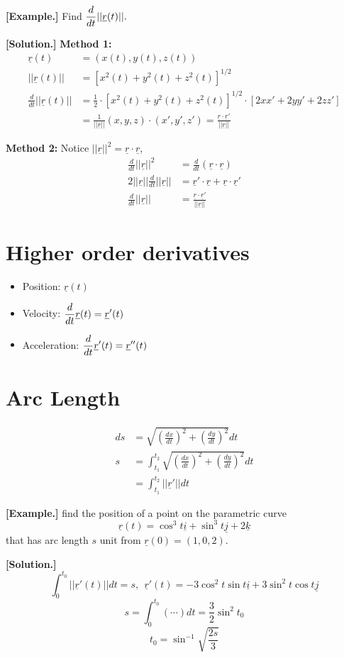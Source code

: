 \documentclass[11pt, a4paper]{MATH2023}
\newcommand{\eg}{\textbf{[Example.] }}
\newcommand{\sol}{\textbf{[Solution.] }}
\newcommand{\rr}{\underline{r}}
\newcommand{\ii}{\underline{i}}
\newcommand{\kk}{\underline{k}}
\newcommand{\jj}{\underline{j}}
\begin{document}
\begin{spacing}{1.3}
    \eg Find $\disp \frac{d}{dt}||\rr(t)||.$

    \sol {\bf Method 1:}
    \begin{align*}
        \rr(t) &= (x(t), y(t), z(t))\\
        ||\rr(t)|| &= [x^2(t)+y^2(t)+z^2(t)]^{1/2}\\
        \frac{d}{dt}||\rr(t)|| &= \frac{1}{2}\cdot [x^2(t)+y^2(t)+z^2(t)]^{1/2}
        \cdot [2xx'+2yy'+2zz']\\
        &= \frac{1}{||\rr||}(x,y,z)\cdot (x',y',z')=\frac{\rr\cdot \rr'}{||\rr||}
    \end{align*}

    {\bf Method 2:} Notice $||\rr||^2=\rr\cdot \rr$,
    \begin{align*}
        \frac{d}{dt}||\rr||^2 &= \frac{d}{dt}(\rr\cdot \rr)\\
        2||\rr||\frac{d}{dt}||\rr|| &= \rr'\cdot \rr+\rr\cdot \rr'\\
        \frac{d}{dt}||\rr|| &= \frac{\rr\cdot \rr'}{||\rr||}
    \end{align*}

    \section{Higher order derivatives}
    \begin{itemize}
        \item Position: $\rr(t)$
        \item Velocity: $\disp \frac{d}{dt}\rr(t) = \rr'(t)$
        \item Acceleration: $\disp \frac{d}{dt}\rr'(t) = \rr''(t)$
    \end{itemize}


    \section{Arc Length}
    \begin{align*}
        ds &= \sqrt{\left(\frac{dx}{dt}\right)^2 + \left(\frac{dy}{dt}\right)^2} dt\\
        s &= \int_{t_1}^{t_2} \sqrt{\left(\frac{dx}{dt}\right)^2 + \left(\frac{dy}{dt}\right)^2} dt\\
        &= \int_{t_1}^{t_2} ||\rr'|| dt
    \end{align*}

    \eg find the position of a point on the parametric curve 
    $$\rr(t)=\cos^3t\ii+\sin^3t\jj+2\kk$$
    that has arc length $s$ unit from $\rr(0)=(1,0,2)$.

    \sol $$\int_{0}^{t_0}||\rr'(t)||dt=s,\ \ \rr'(t)=-3\cos^2t\sin t\ii+3\sin^2 t\cos t\jj$$
    $$s=\int_{0}^{t_0}(\cdots)dt=\frac{3}{2}\sin^2 t_0$$
    $$t_0=\sin^{-1}\sqrt{\frac{2s}{3}}$$
    

\end{spacing}
\end{document}
